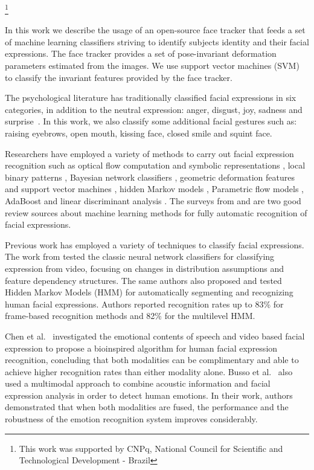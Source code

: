 \documentclass[]{article}
\begin{document}
\footnote{This work was supported by CNPq, National Council for Scientific and Technological Development - Brazil}

In this work we describe the usage of an open-source face tracker that feeds a set of machine learning classifiers
striving to identify subjects identity and their facial expressions. The face tracker provides a set of pose-invariant
deformation parameters estimated from the images. We use support vector machines (SVM) to classify the invariant
features provided by the face tracker.


The psychological literature has traditionally classified facial expressions in six categories, in addition to the
neutral expression: anger, disgust, joy, sadness and surprise~\cite{schmidt2002human}. In this work, we
also classify some additional facial gestures such as: raising eyebrows, open mouth, kissing face, closed smile and
squint face.


Researchers have employed a variety of methods to carry out facial expression recognition such as optical flow
computation  and symbolic representations \cite{Yacoob506414}, local binary patterns \cite{Shan2009803},  Bayesian
network classifiers \cite{Cohen1211408}, geometric deformation features and support vector machines
\cite{kotsia4032815}, hidden Markov models \cite{aleksic1597130, Cohen2003160}, Parametric flow models
\cite{blackAndYacoob}, AdaBoost and linear discriminant analysis \cite{bartlett1398364}. The surveys from
\cite{bartlett1398364} and \cite{Fasel2003259} are two good review sources about machine learning methods 
for fully automatic recognition of facial expressions. 


Previous work has employed a variety of techniques to classify  facial expressions. The work from \cite{Cohen2003160}
tested the classic neural network classifiers for classifying expression from video, focusing on changes in distribution
assumptions and feature dependency structures. The same authors also proposed and tested Hidden Markov Models (HMM) for
automatically segmenting and recognizing human facial expressions. Authors reported recognition rates up to 83\% for
frame-based recognition methods and 82\% for the multilevel HMM.


Chen et al.~\cite{Chen670976} investigated the emotional contents of speech and video based facial expression to
propose a bioinspired algorithm for human facial expression recognition, concluding that both modalities can be
complimentary and able to achieve higher recognition rates than either modality alone. Busso et al.~\cite{Busso:2004} also
used a multimodal approach to combine acoustic information and facial expression analysis in order to detect human
emotions. In their work, authors demonstrated that when both modalities are fused, the performance and the robustness of
the emotion recognition system improves considerably.
\end{document}
